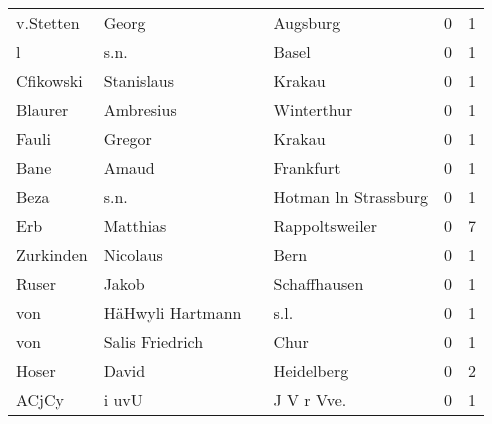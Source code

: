 \begin{tabular}{llllrr}
                v.Stetten &                              Georg &             &                                    Augsburg &          0 &         1 \\
                        l &                               s.n. &             &                                       Basel &          0 &         1 \\
                Cfikowski &                         Stanislaus &             &                                      Krakau &          0 &         1 \\
                  Blaurer &                          Ambresius &             &                                  Winterthur &          0 &         1 \\
                    Fauli &                             Gregor &             &                                      Krakau &          0 &         1 \\
                     Bane &                              Amaud &             &                                   Frankfurt &          0 &         1 \\
                     Beza &                               s.n. &             &                        Hotman ln Strassburg &          0 &         1 \\
                      Erb &                           Matthias &             &                              Rappoltsweiler &          0 &         7 \\
                Zurkinden &                           Nicolaus &             &                                        Bern &          0 &         1 \\
                    Ruser &                              Jakob &             &                                Schaffhausen &          0 &         1 \\
                      von &                   HäHwyli Hartmann &             &                                        s.l. &          0 &         1 \\
                      von &                    Salis Friedrich &             &                                        Chur &          0 &         1 \\
                    Hoser &                              David &             &                                  Heidelberg &          0 &         2 \\
                    ACjCy &                              i uvU &             &                                 J V r Vve.  &          0 &         1 \\

\end{tabular}
